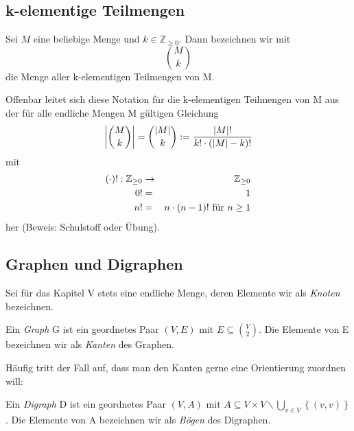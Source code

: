 \documentclass[10pt]{scrbook}
\begin{document}
\subsection{k-elementige Teilmengen}

\begin{Def}
Sei $M$ eine beliebige Menge und $k\in \mathbb{Z}_{\geq 0}$. Dann bezeichnen wir mit
\begin{displaymath}
M \choose k
\end{displaymath}
die Menge aller k-elementigen Teilmengen von M.
\end{Def}

\begin{Bem}
Offenbar leitet sich diese Notation für die k-elementigen Teilmengen von M aus der für alle endliche Mengen M gültigen Gleichung
\begin{displaymath}
{\left| {M \choose k} \right|} = {{\left| M \right|} \choose k} := {{\left| M \right|!}\over {k! \cdot \left(\left| M \right|-k\right)!}}
\end{displaymath}
mit
\begin{eqnarray*}
\left(\cdot\right)! : \mathbb{Z}_{\geq 0} & \rightarrow & \mathbb{Z}_{\geq 0} \\
0! & = & 1 \\
n! & = & n\cdot \left(n-1\right)!\textnormal{ für } n\geq 1
\end{eqnarray*}
her (Beweis: Schulstoff oder Übung).
\end{Bem}

\subsection{Graphen und Digraphen}

\begin{Def}
Sei für das Kapitel V stets eine endliche Menge, deren Elemente wir als \emph{Knoten} bezeichnen.
\end{Def}

\begin{Def}
Ein \emph{Graph} G ist ein geordnetes Paar $(V, E)$ mit $E\subseteq {V \choose 2}$. Die Elemente von E bezeichnen wir als \emph{Kanten} des Graphen.
\end{Def}

Häufig tritt der Fall auf, dass man den Kanten gerne eine Orientierung zuordnen will:

\begin{Def}
Ein \emph{Digraph} D ist ein geordnetes Paar $(V, A)$ mit $A\subseteq V \times V \backslash \bigcup_{v\in V}\left\{\left(v, v\right)\right\}$. Die Elemente von A bezeichnen wir als \emph{Bögen} des Digraphen.
\end{Def}
\end{document}
